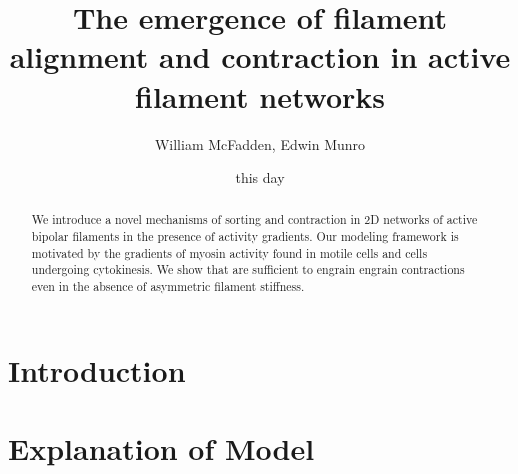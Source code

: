 \documentclass[pre,preprint]{revtex4-1}
\begin{document}
\title{The emergence of filament alignment and contraction in active filament networks}
\author{William McFadden, Edwin Munro}

\date{this day}


\begin{abstract}
We introduce a novel mechanisms of sorting and contraction in 2D networks of active bipolar filaments in the presence of activity gradients.  Our modeling framework is motivated by the gradients of myosin activity found in motile cells and cells undergoing cytokinesis.  We show that are sufficient to engrain engrain contractions even in the absence of asymmetric filament stiffness.  
\end{abstract}



\maketitle


\tableofcontents


















\section{Introduction}

































\section{Explanation of Model}
\end{document}
